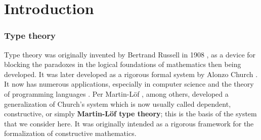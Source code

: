 \chapter*{Introduction}
\label{cha:introduction}


{%


\newcommand{\UU}{{\mathcal U}}
\newcommand{\idtypevar}{{{\sf Id}}}
\newcommand{\eq}{{{\sf Eq}}}



%
%
%
%
%
%
%
%



\subsection*{Type theory}

Type theory was originally invented by Bertrand Russell in 1908 \cite{Russell:1908}, as a device for blocking the paradoxes in the logical foundations of mathematics then being developed. It was later developed as a rigorous formal system by Alonzo Church \cite{Church:1933cl,Church:1940tu,Church:1941tc}.  It now has numerous applications, especially in computer science and the theory of programming languages \cite{Pierce:2002tp}.   Per Martin-L\"{o}f \cite{MartinLof:1998tw,MartinLof:1975tb,MartinLof:1982bn,MartinLof:1984tr}, among others,
developed a generalization of Church's system which is now usually called dependent, constructive, or simply {\bf Martin\--L\"of type theory}; this is the basis of the system that we consider here. It was originally intended as a rigorous framework for the formalization of constructive mathematics. 

}

